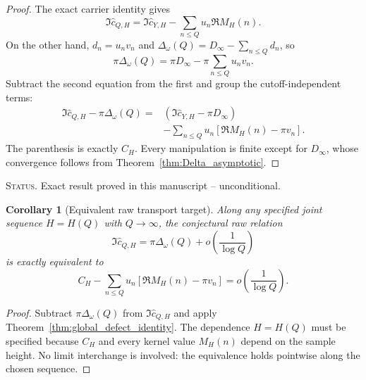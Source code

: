 \documentclass[11pt]{amsart}
\numberwithin{equation}{section}
\theoremstyle{plain}
\newtheorem{corollary}[theorem]{Corollary}
\theoremstyle{definition}
\theoremstyle{remark}
\newcommand{\1}{\mathbf{1}}
\newcommand{\statusnote}[1]{%
  \par\smallskip\noindent
  \begingroup\footnotesize\textsc{Status.} #1\endgroup
  \par\smallskip}
\begin{document}
\begin{proof}
The exact carrier identity gives
\begin{equation}
\Im\widehat c_{Q,H}
=
\Im\widehat c_{Y,H}
-
\sum_{n\leq Q}u_n\Re M_H(n).
\label{eq:global_defect_proof_carrier}
\end{equation}
On the other hand, \(d_n=u_nv_n\) and
\(\Delta_\omega(Q)=D_\infty-\sum_{n\leq Q}d_n\), so
\begin{equation}
\pi\Delta_\omega(Q)
=
\pi D_\infty
-
\pi\sum_{n\leq Q}u_nv_n.
\label{eq:global_defect_proof_Delta}
\end{equation}
Subtract the second equation from the first and group the cutoff-independent
terms:
\begin{align}
\Im\widehat c_{Q,H}-\pi\Delta_\omega(Q)
={}&
\left(\Im\widehat c_{Y,H}-\pi D_\infty\right)
\label{eq:global_defect_proof_group_one}
\\
&-
\sum_{n\leq Q}u_n
\left[\Re M_H(n)-\pi v_n\right].
\label{eq:global_defect_proof_group_two}
\end{align}
The parenthesis is exactly \(C_H\).  Every manipulation is finite except
for \(D_\infty\), whose convergence follows from
Theorem~\ref{thm:Delta_asymptotic}.
\end{proof}

\statusnote{Exact result proved in this manuscript -- unconditional.}
\begin{corollary}[Equivalent raw transport target]
\label{cor:transport_target}
Along any specified joint sequence \(H=H(Q)\) with \(Q\to\infty\), the
conjectural raw relation
\begin{equation}
\Im\widehat c_{Q,H}
=
\pi\Delta_\omega(Q)
+
o\left(\frac1{\log Q}\right)
\label{eq:transport_relation}
\end{equation}
is exactly equivalent to
\begin{equation}
\boxed{
C_H
-
\sum_{n\leq Q}
u_n\left[
\Re M_H(n)-\pi v_n
\right]
=
o\left(\frac1{\log Q}\right).
}
\label{eq:equivalent_transport_target}
\end{equation}
\end{corollary}

\begin{proof}
Subtract \(\pi\Delta_\omega(Q)\) from
\(\Im\widehat c_{Q,H}\) and apply
Theorem~\ref{thm:global_defect_identity}.  The dependence
\(H=H(Q)\) must be specified because \(C_H\) and every kernel value
\(M_H(n)\) depend on the sample height.  No limit interchange is involved:
the equivalence holds pointwise along the chosen sequence.
\end{proof}
\end{document}

